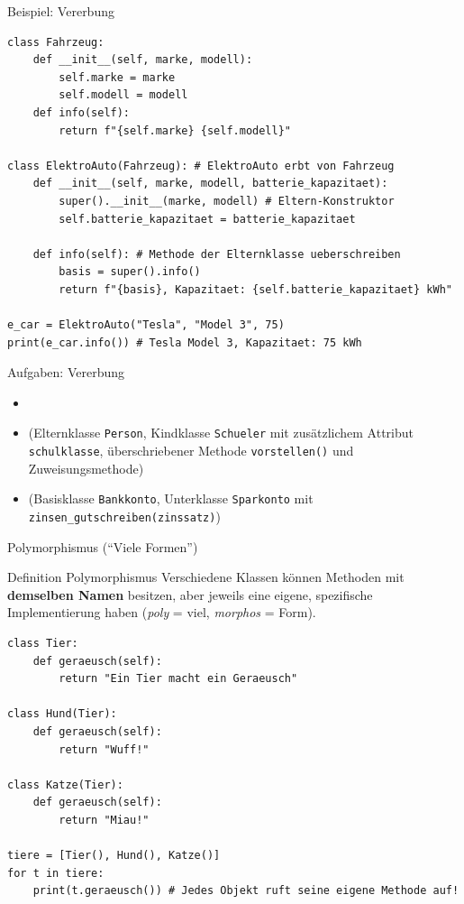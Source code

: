 \begin{frame}[fragile]{Beispiel: Vererbung}
	\begin{lstlisting}[basicstyle=\ttfamily\scriptsize]
class Fahrzeug:
    def __init__(self, marke, modell):
        self.marke = marke
        self.modell = modell
    def info(self):
        return f"{self.marke} {self.modell}"

class ElektroAuto(Fahrzeug): # ElektroAuto erbt von Fahrzeug
    def __init__(self, marke, modell, batterie_kapazitaet):
        super().__init__(marke, modell) # Eltern-Konstruktor
        self.batterie_kapazitaet = batterie_kapazitaet

    def info(self): # Methode der Elternklasse ueberschreiben
        basis = super().info()
        return f"{basis}, Kapazitaet: {self.batterie_kapazitaet} kWh"

e_car = ElektroAuto("Tesla", "Model 3", 75)
print(e_car.info()) # Tesla Model 3, Kapazitaet: 75 kWh
\end{lstlisting}
\end{frame}

\begin{frame}[fragile]{Aufgaben: Vererbung}
	\begin{itemize}
		\item {}
		\item {} (Elternklasse \lstinline|Person|, Kindklasse \lstinline|Schueler| mit zusätzlichem Attribut \lstinline|schulklasse|, überschriebener Methode \lstinline|vorstellen()| und Zuweisungsmethode)
		\item {} (Basisklasse \lstinline|Bankkonto|, Unterklasse \lstinline|Sparkonto| mit \lstinline|zinsen_gutschreiben(zinssatz)|)
	\end{itemize}
\end{frame}

\begin{frame}[fragile]{Polymorphismus (\enquote{Viele Formen})}
	\begin{block}{Definition Polymorphismus}
		Verschiedene Klassen können Methoden mit \textbf{demselben Namen} besitzen, aber jeweils eine eigene, spezifische Implementierung haben (\textit{poly} = viel, \textit{morphos} = Form).
	\end{block}
	\pause
	\begin{lstlisting}[basicstyle=\ttfamily\scriptsize]
class Tier:
    def geraeusch(self):
        return "Ein Tier macht ein Geraeusch"

class Hund(Tier):
    def geraeusch(self):
        return "Wuff!"

class Katze(Tier):
    def geraeusch(self):
        return "Miau!"

tiere = [Tier(), Hund(), Katze()]
for t in tiere:
    print(t.geraeusch()) # Jedes Objekt ruft seine eigene Methode auf!
\end{lstlisting}
\end{frame}

